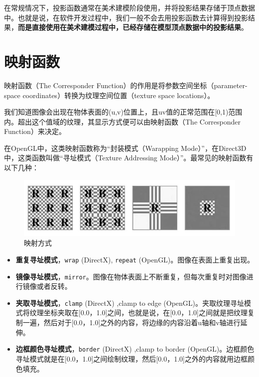 \documentclass[UTF8,a4paper,12pt]{ctexbook}
\begin{document}
		在常规情况下，投影函数通常在美术建模阶段使用，并将投影结果存储于顶点数据中。也就是说，在软件开发过程中，我们一般不会去用投影函数去计算得到投影结果，\textbf{而是直接使用在美术建模过程中，已经存储在模型顶点数据中的投影结果}。
		
	\section{映射函数}
		映射函数（The Corresponder Function）的作用是将参数空间坐标（parameter-space coordinates）转换为纹理空间位置（texture space locations）。
		
		我们知道图像会出现在物体表面的(u,v)位置上，且uv值的正常范围在[0,1)范围内。超出这个值域的纹理，其显示方式便可以由映射函数（The Corresponder Function）来决定。
		
		在OpenGL中，这类映射函数称为“封装模式（Warapping Mode）”，在Direct3D中，这类函数叫做“寻址模式（Texture Addressing Mode）”。最常见的映射函数有以下几种：
			
			\begin{figure}[H]
				\centering
				\includegraphics[scale=0.57]{Mapping}
				\caption{映射方式}
			\end{figure}
			
			\begin{itemize}
				\item \textbf{重复寻址模式}，\verb|wrap| (DirectX), \verb|repeat| (OpenGL)。图像在表面上重复出现。
				\item \textbf{镜像寻址模式}，\verb|mirror|。图像在物体表面上不断重复，但每次重复时对图像进行镜像或者反转。
				\item \textbf{夹取寻址模式}，\verb|clamp| (DirectX) ,clamp to edge (OpenGL)。夹取纹理寻址模式将纹理坐标夹取在[0.0，1.0]之间，也就是说，在[0.0，1.0]之间就是把纹理复制一遍，然后对于[0.0，1.0]之外的内容，将边缘的内容沿着u轴和v轴进行延伸。
				\item \textbf{边框颜色寻址模式}，\verb|border| (DirectX) ,clamp to border (OpenGL)。边框颜色寻址模式就是在[0.0，1.0]之间绘制纹理，然后[0.0，1.0]之外的内容就用边框颜色填充。		
			\end{itemize}
\end{document}
